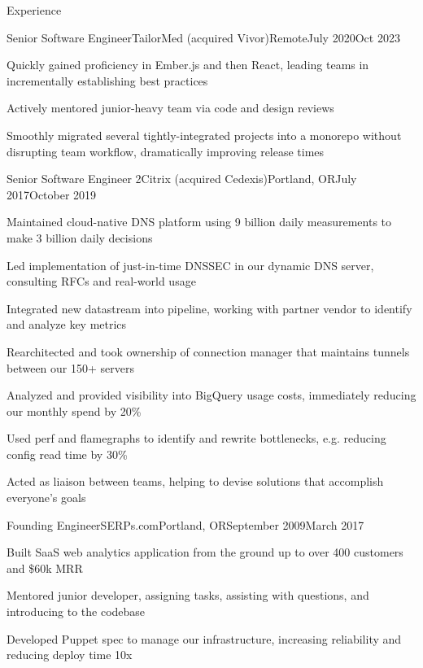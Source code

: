 \documentclass[letterpaper,10pt]{article}
\begin{document}
\begin{rsection}{Experience}
\begin{rexperienceitem}{Senior Software Engineer}{TailorMed (acquired Vivor)}{Remote}{July 2020}{Oct 2023}
  \item Quickly gained proficiency in Ember.js and then React, leading teams in incrementally establishing best practices
  \item Actively mentored junior-heavy team via code and design reviews
  \item Smoothly migrated several tightly-integrated projects into a monorepo without disrupting team workflow, dramatically improving release times
\end{rexperienceitem}
\begin{rexperienceitem}{Senior Software Engineer 2}{Citrix (acquired Cedexis)}{Portland, OR}{July 2017}{October 2019}
  \item Maintained cloud-native DNS platform using 9 billion daily measurements to make 3 billion daily decisions
  \item Led implementation of just-in-time DNSSEC in our dynamic DNS server, consulting RFCs and real-world usage
  \item Integrated new datastream into pipeline, working with partner vendor to identify and analyze key metrics
  \item Rearchitected and took ownership of connection manager that maintains tunnels between our 150+ servers
  \item Analyzed and provided visibility into BigQuery usage costs, immediately reducing our monthly spend by 20\%
  \item Used perf and flamegraphs to identify and rewrite bottlenecks, e.g. reducing config read time by 30\%
  \item Acted as liaison between teams, helping to devise solutions that accomplish everyone's goals
\end{rexperienceitem}
\begin{rexperienceitem}{Founding Engineer}{SERPs.com}{Portland, OR}{September 2009}{March 2017}
  \item Built SaaS web analytics application from the ground up to over 400 customers and \$60k MRR
  \item Mentored junior developer, assigning tasks, assisting with questions, and introducing to the codebase
  \item Developed Puppet spec to manage our infrastructure, increasing reliability and reducing deploy time 10x

\end{rexperienceitem}
\end{rsection}
\end{document}
